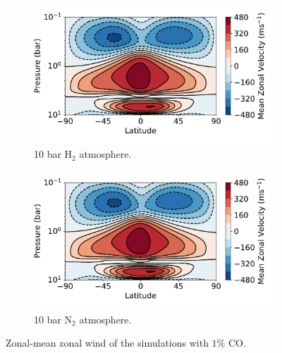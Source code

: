 \begin{figure}
  \centering
  \begin{subfigure}[t]{0.49\textwidth}
    \includegraphics[width=\textwidth]{figures/soc-lava-planets/h2-soc-zonal-u.pdf}
    \caption{10 bar H$_{2}$ atmosphere.}\label{fig:soc-zonal-u-h2}
  \end{subfigure}
  \begin{subfigure}[t]{0.49\textwidth}
    \includegraphics[width=\textwidth]{figures/soc-lava-planets/h2-soc-zonal-u.pdf}
    \caption{10 bar N$_{2}$ atmosphere.}\label{fig:soc-zonal-u-n2}
  \end{subfigure}
  \caption{Zonal-mean zonal wind of the simulations with $1\%$ CO.}
  \label{fig:soc-zonal-u}
\end{figure}

